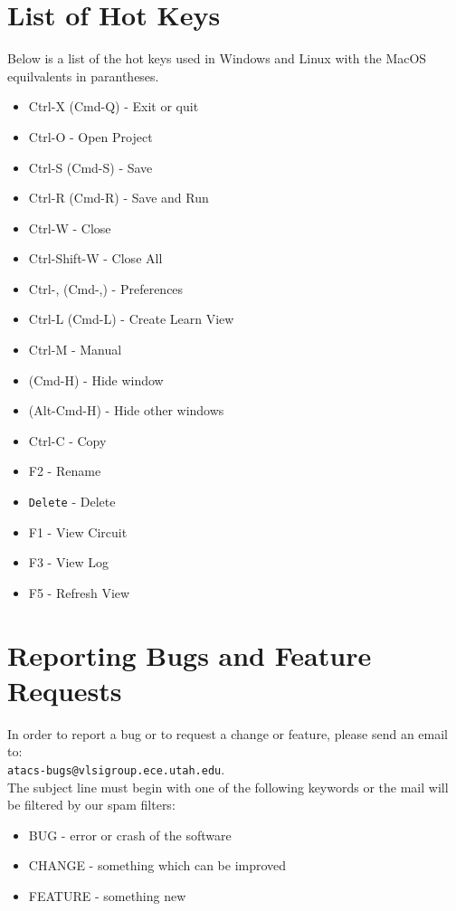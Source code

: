 \documentclass[titlepage,11pt]{article}
\begin{document}
\section{\label{HotKeys}List of Hot Keys}

Below is a list of the hot keys used in Windows and Linux with the
MacOS equilvalents in parantheses.
\begin{itemize}
\item Ctrl-X (Cmd-Q) - Exit or quit
\item Ctrl-O - Open Project
\item Ctrl-S (Cmd-S) - Save
\item Ctrl-R (Cmd-R) - Save and Run
\item Ctrl-W - Close
\item Ctrl-Shift-W - Close All
\item Ctrl-, (Cmd-,) - Preferences
\item Ctrl-L (Cmd-L) - Create Learn View
\item Ctrl-M - Manual
\item (Cmd-H) - Hide window
\item (Alt-Cmd-H) - Hide other windows
\item Ctrl-C - Copy
\item F2 - Rename
\item {\tt Delete} - Delete
\item F1 - View Circuit
\item F3 - View Log
\item F5 - Refresh View
\end{itemize}

\section{Reporting Bugs and Feature Requests}

\noindent
In order to report a bug or to request a change or feature, please
send an email to:\\ 
{\tt atacs-bugs@vlsigroup.ece.utah.edu}.\\
The subject line must begin with one of the following keywords or the
mail will be filtered by our spam filters:
\begin{itemize}
\item BUG - error or crash of the software
\item CHANGE - something which can be improved
\item FEATURE - something new
\end{itemize}
\end{document}
